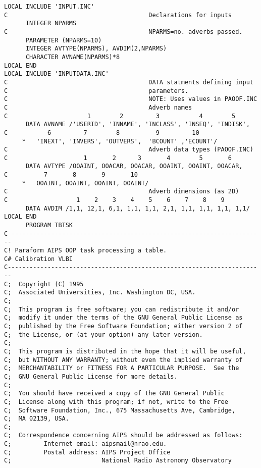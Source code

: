 {{\small\begin{verbatim}
LOCAL INCLUDE 'INPUT.INC'
C                                       Declarations for inputs
      INTEGER NPARMS
C                                       NPARMS=no. adverbs passed.
      PARAMETER (NPARMS=10)
      INTEGER AVTYPE(NPARMS), AVDIM(2,NPARMS)
      CHARACTER AVNAME(NPARMS)*8
LOCAL END
LOCAL INCLUDE 'INPUTDATA.INC'
C                                       DATA statments defining input
C                                       parameters.
C                                       NOTE: Uses values in PAOOF.INC
C                                       Adverb names
C                      1        2         3           4        5
      DATA AVNAME /'USERID', 'INNAME', 'INCLASS', 'INSEQ', 'INDISK',
C           6         7        8          9         10
     *   'INEXT', 'INVERS', 'OUTVERS',  'BCOUNT' ,'ECOUNT'/
C                                       Adverb data types (PAOOF.INC)
C                     1       2      3       4        5       6
      DATA AVTYPE /OOAINT, OOACAR, OOACAR, OOAINT, OOAINT, OOACAR,
C          7       8       9       10
     *   OOAINT, OOAINT, OOAINT, OOAINT/
C                                       Adverb dimensions (as 2D)
C                   1    2    3    4    5    6    7    8    9
      DATA AVDIM /1,1, 12,1, 6,1, 1,1, 1,1, 2,1, 1,1, 1,1, 1,1, 1,1/
LOCAL END
      PROGRAM TBTSK
C-----------------------------------------------------------------------
C! Paraform AIPS OOP task processing a table.
C# Calibration VLBI
C-----------------------------------------------------------------------
C;  Copyright (C) 1995
C;  Associated Universities, Inc. Washington DC, USA.
C;
C;  This program is free software; you can redistribute it and/or
C;  modify it under the terms of the GNU General Public License as
C;  published by the Free Software Foundation; either version 2 of
C;  the License, or (at your option) any later version.
C;
C;  This program is distributed in the hope that it will be useful,
C;  but WITHOUT ANY WARRANTY; without even the implied warranty of
C;  MERCHANTABILITY or FITNESS FOR A PARTICULAR PURPOSE.  See the
C;  GNU General Public License for more details.
C;
C;  You should have received a copy of the GNU General Public
C;  License along with this program; if not, write to the Free
C;  Software Foundation, Inc., 675 Massachusetts Ave, Cambridge,
C;  MA 02139, USA.
C;
C;  Correspondence concerning AIPS should be addressed as follows:
C;         Internet email: aipsmail@nrao.edu.
C;         Postal address: AIPS Project Office
C;                         National Radio Astronomy Observatory

\end{verbatim}}}
